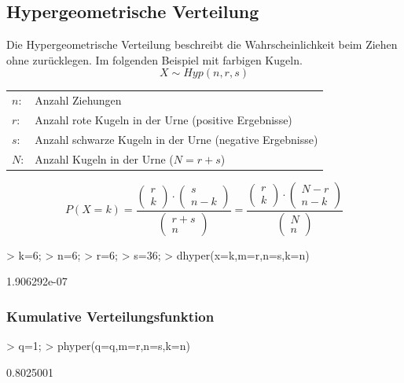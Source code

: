 \subsection{Hypergeometrische Verteilung}
Die Hypergeometrische Verteilung beschreibt die Wahrscheinlichkeit beim 
Ziehen ohne zurücklegen. Im folgenden Beispiel mit farbigen Kugeln. 
\[ X \sim Hyp(n, r, s) \]
\begin{tabular}{@{}ll}
  $n$: & Anzahl Ziehungen \\
  $r$: & Anzahl rote Kugeln in der Urne (positive Ergebnisse) \\
  $s$: & Anzahl schwarze Kugeln in der Urne (negative Ergebnisse) \\
  $N$: & Anzahl Kugeln in der Urne ($N = r + s$)
\end{tabular}
\[ P(X=k) 
= \frac{\left( \begin{array}{c}r\\k\end{array} \right) \cdot 
\left( \begin{array}{c}s\\n-k\end{array} \right)}
{\left( \begin{array}{c}r+s\\n\end{array} \right)} 
= \frac{\left( \begin{array}{c}r\\k\end{array} \right) \cdot 
\left( \begin{array}{c}N-r\\n-k\end{array} \right)}
{\left( \begin{array}{c}N\\n\end{array} \right)} \]
\begin{Schunk}
\begin{Sinput}
> k=6;
> n=6;
> r=6;
> s=36;
> dhyper(x=k,m=r,n=s,k=n)
\end{Sinput}
\begin{Soutput}
[1] 1.906292e-07
\end{Soutput}
\end{Schunk}
\subsubsection{Kumulative Verteilungsfunktion}
\begin{Schunk}
\begin{Sinput}
> q=1;
> phyper(q=q,m=r,n=s,k=n)
\end{Sinput}
\begin{Soutput}
[1] 0.8025001
\end{Soutput}
\end{Schunk}


